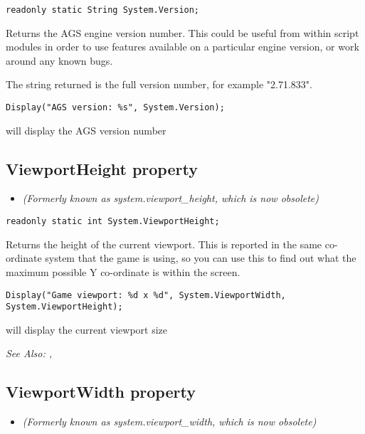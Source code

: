 \begin{verbatim}
readonly static String System.Version;
\end{verbatim}
Returns the AGS engine version number. This could be useful from within script modules
in order to use features available on a particular engine version, or work around
any known bugs.

The string returned is the full version number, for example "2.71.833".

\begin{verbatim}
Display("AGS version: %s", System.Version);
\end{verbatim}
will display the AGS version number


\subsection{ViewportHeight property}\label{System.ViewportHeight}%

\begin{itemize}
\item \it{(Formerly known as system.viewport_height, which is now obsolete)}
\end{itemize}

\begin{verbatim}
readonly static int System.ViewportHeight;
\end{verbatim}
Returns the height of the current viewport. This is reported in the same co-ordinate system
that the game is using, so you can use this to find out what the maximum possible Y co-ordinate
is within the screen.

\begin{verbatim}
Display("Game viewport: %d x %d", System.ViewportWidth, System.ViewportHeight);
\end{verbatim}
will display the current viewport size

\it{See Also:} ,


\subsection{ViewportWidth property}\label{System.ViewportWidth}%

\begin{itemize}
\item \it{(Formerly known as system.viewport_width, which is now obsolete)}
\end{itemize}

